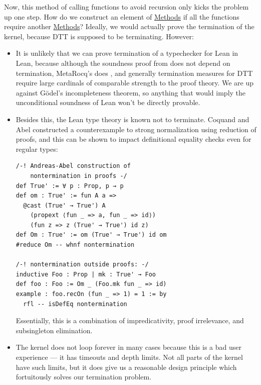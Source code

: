 \documentclass[sigplan,10pt,screen]{acmart}\settopmatter{printfolios=true,printccs=false,printacmref=false}
\newcommand{\code}[1]{\mbox{\ttfamily\small #1}}
\begin{document}
Now, this method of calling functions to avoid recursion only kicks the problem up one step. How do we construct an element of \href{https://github.com/digama0/lean4lean/blob/cpp2026/Lean4Lean/TypeChecker.lean#L53}{\code{Methods}} if all the functions require another \href{https://github.com/digama0/lean4lean/blob/cpp2026/Lean4Lean/TypeChecker.lean#L53}{\code{Methods}}? Ideally, we would actually prove the termination of the kernel, because DTT is supposed to be terminating. However:
\begin{itemize}
  \item It is unlikely that we can prove termination of a typechecker for Lean in Lean, because although the soundness proof from \cite{leantt} does not depend on termination, MetaRocq's does \cite{coqcoqcorrect}, and generally termination measures for DTT require large cardinals of comparable strength to the proof theory. We are up against G\"{o}del's incompleteness theorem, so anything that would imply the unconditional soundness of Lean won't be directly provable.
  \item Besides this, the Lean type theory is known not to terminate. Coquand and Abel \cite{coqabel} constructed a counterexample to strong normalization using reduction of proofs, and this can be shown to impact definitional equality checks even for regular types:
\begin{lstlisting}
/-! Andreas-Abel construction of
    nontermination in proofs -/
def True' := ∀ p : Prop, p → p
def om : True' := fun A a =>
  @cast (True' → True') A
    (propext ⟨fun _ => a, fun _ => id⟩)
    (fun z => z (True' → True') id z)
def Om : True' := om (True' → True') id om
#reduce Om -- whnf nontermination

/-! nontermination outside proofs: -/
inductive Foo : Prop | mk : True' → Foo
def foo : Foo := Om _ (Foo.mk fun _ => id)
example : foo.recOn (fun _ => 1) = 1 := by
  rfl -- isDefEq nontermination
\end{lstlisting}
  Essentially, this is a combination of impredicativity, proof irrelevance, and subsingleton elimination.
  \item The kernel does not loop forever in many cases because this is a bad user experience --- it has timeouts and depth limits. Not all parts of the kernel have such limits, but it does give us a reasonable design principle which fortuitously solves our termination problem.
\end{itemize}
\end{document}
